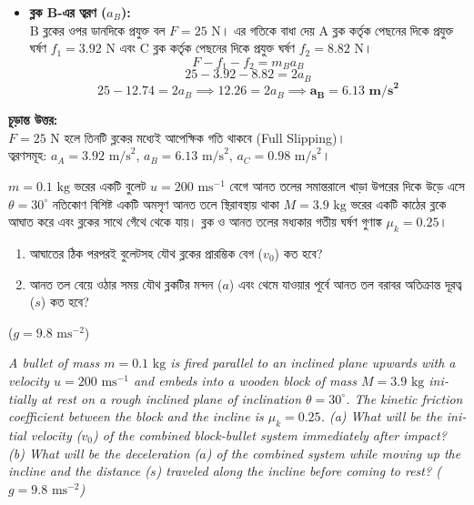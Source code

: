 \documentclass[12pt, a4paper]{article}
\begin{document}
\begin{tcolorbox}[solutionbox={সমাধান (Solution) }]
\begin{itemize}[leftmargin=*, parsep=0.5ex]
    \item \textbf{ব্লক B-এর ত্বরণ ($a_B$):} \\
    B ব্লকের ওপর ডানদিকে প্রযুক্ত বল $F = 25\text{ N}$। এর গতিকে বাধা দেয় A ব্লক কর্তৃক পেছনের দিকে প্রযুক্ত ঘর্ষণ $f_1 = 3.92\text{ N}$ এবং C ব্লক কর্তৃক পেছনের দিকে প্রযুক্ত ঘর্ষণ $f_2 = 8.82\text{ N}$।
    \[ F - f_1 - f_2 = m_B a_B \]
    \[ 25 - 3.92 - 8.82 = 2 a_B \]
    \[ 25 - 12.74 = 2 a_B \implies 12.26 = 2 a_B \implies \mathbf{a_B = 6.13\text{ m/s}^2} \]
\end{itemize}

\vspace{1em}
\begin{tcolorbox}[answerbox]
\textbf{চূড়ান্ত উত্তর:} \\
$F = 25\text{ N}$ হলে তিনটি ব্লকের মধ্যেই আপেক্ষিক গতি থাকবে (Full Slipping)। \\
ত্বরণসমূহ: $a_A = 3.92\text{ m/s}^2$, \quad $a_B = 6.13\text{ m/s}^2$, \quad $a_C = 0.98\text{ m/s}^2$।
\end{tcolorbox}
\end{tcolorbox}
\begin{tcolorbox}[questionbox={প্রশ্ন (Question)7}]
\noindent
$m = 0.1\text{ kg}$ ভরের একটি বুলেট $u = 200\text{ ms}^{-1}$ বেগে আনত তলের সমান্তরালে খাড়া উপরের দিকে উড়ে এসে $\theta = 30^\circ$ নতিকোণ বিশিষ্ট একটি অমসৃণ আনত তলে স্থিরাবস্থায় থাকা $M = 3.9\text{ kg}$ ভরের একটি কাঠের ব্লকে আঘাত করে এবং ব্লকের সাথে গেঁথে থেকে যায়। ব্লক ও আনত তলের মধ্যকার গতীয় ঘর্ষণ গুণাঙ্ক $\mu_k = 0.25$। 
\begin{enumerate}
    \item[(ক)] আঘাতের ঠিক পরপরই বুলেটসহ যৌথ ব্লকের প্রারম্ভিক বেগ ($v_0$) কত হবে?
    \item[(খ)] আনত তল বেয়ে ওঠার সময় যৌথ ব্লকটির মন্দন ($a$) এবং থেমে যাওয়ার পূর্বে আনত তল বরাবর অতিক্রান্ত দূরত্ব ($s$) কত হবে?
\end{enumerate}
($g = 9.8\text{ ms}^{-2}$)

\vspace{0.8em}
\begin{english}
\noindent\textit{\color{darkgray}
A bullet of mass $m = 0.1\text{ kg}$ is fired parallel to an inclined plane upwards with a velocity $u = 200\text{ ms}^{-1}$ and embeds into a wooden block of mass $M = 3.9\text{ kg}$ initially at rest on a rough inclined plane of inclination $\theta = 30^\circ$. The kinetic friction coefficient between the block and the incline is $\mu_k = 0.25$. 
(a) What will be the initial velocity ($v_0$) of the combined block-bullet system immediately after impact? 
(b) What will be the deceleration ($a$) of the combined system while moving up the incline and the distance ($s$) traveled along the incline before coming to rest? ($g = 9.8\text{ ms}^{-2}$)
}
\end{english}
\end{tcolorbox}
\end{document}
